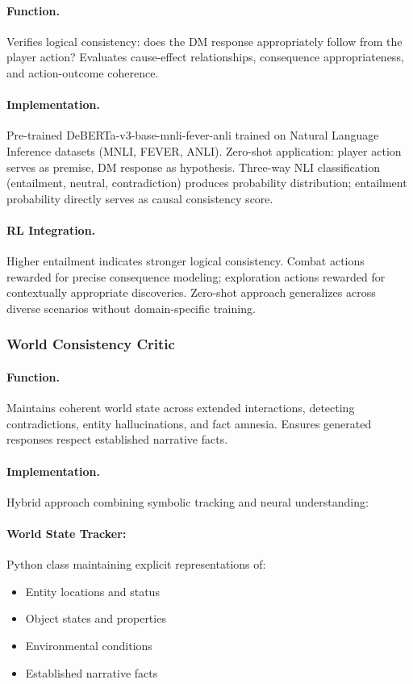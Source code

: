 \documentclass[11pt]{article}
\begin{document}
\paragraph{Function.} Verifies logical consistency: does the DM response appropriately follow from the player action? Evaluates cause-effect relationships, consequence appropriateness, and action-outcome coherence.

\paragraph{Implementation.} Pre-trained DeBERTa-v3-base-mnli-fever-anli trained on Natural Language Inference datasets (MNLI, FEVER, ANLI). Zero-shot application: player action serves as premise, DM response as hypothesis. Three-way NLI classification (entailment, neutral, contradiction) produces probability distribution; entailment probability directly serves as causal consistency score.

\paragraph{RL Integration.} Higher entailment indicates stronger logical consistency. Combat actions rewarded for precise consequence modeling; exploration actions rewarded for contextually appropriate discoveries. Zero-shot approach generalizes across diverse scenarios without domain-specific training.

\subsubsection{World Consistency Critic}

\paragraph{Function.} Maintains coherent world state across extended interactions, detecting contradictions, entity hallucinations, and fact amnesia. Ensures generated responses respect established narrative facts.

\paragraph{Implementation.} Hybrid approach combining symbolic tracking and neural understanding:

\paragraph{World State Tracker:} Python class maintaining explicit representations of:
\begin{itemize}
\item Entity locations and status
\item Object states and properties
\item Environmental conditions
\item Established narrative facts
\end{itemize}
\end{document}
